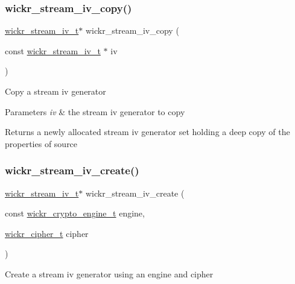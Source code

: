 \subsubsection{\texorpdfstring{wickr\+\_\+stream\+\_\+iv\+\_\+copy()}{wickr\_stream\_iv\_copy()}}
{\footnotesize\ttfamily \hyperlink{structwickr__stream__iv}{wickr\+\_\+stream\+\_\+iv\+\_\+t}$\ast$ wickr\+\_\+stream\+\_\+iv\+\_\+copy (\begin{DoxyParamCaption}\item[{const \hyperlink{structwickr__stream__iv}{wickr\+\_\+stream\+\_\+iv\+\_\+t} $\ast$}]{iv }\end{DoxyParamCaption})}

Copy a stream iv generator


\begin{DoxyParams}{Parameters}
{\em iv} & the stream iv generator to copy \\
\hline
\end{DoxyParams}
\begin{DoxyReturn}{Returns}
a newly allocated stream iv generator set holding a deep copy of the properties of \textquotesingle{}source\textquotesingle{} 
\end{DoxyReturn}
\mbox{\label{group__wickr__stream__iv_gaaad5726a228b7866b0cb392c131f95be}} 
\subsubsection{\texorpdfstring{wickr\+\_\+stream\+\_\+iv\+\_\+create()}{wickr\_stream\_iv\_create()}}
{\footnotesize\ttfamily \hyperlink{structwickr__stream__iv}{wickr\+\_\+stream\+\_\+iv\+\_\+t}$\ast$ wickr\+\_\+stream\+\_\+iv\+\_\+create (\begin{DoxyParamCaption}\item[{const \hyperlink{structwickr__crypto__engine}{wickr\+\_\+crypto\+\_\+engine\+\_\+t}}]{engine,  }\item[{\hyperlink{structwickr__cipher}{wickr\+\_\+cipher\+\_\+t}}]{cipher }\end{DoxyParamCaption})}

Create a stream iv generator using an engine and cipher


